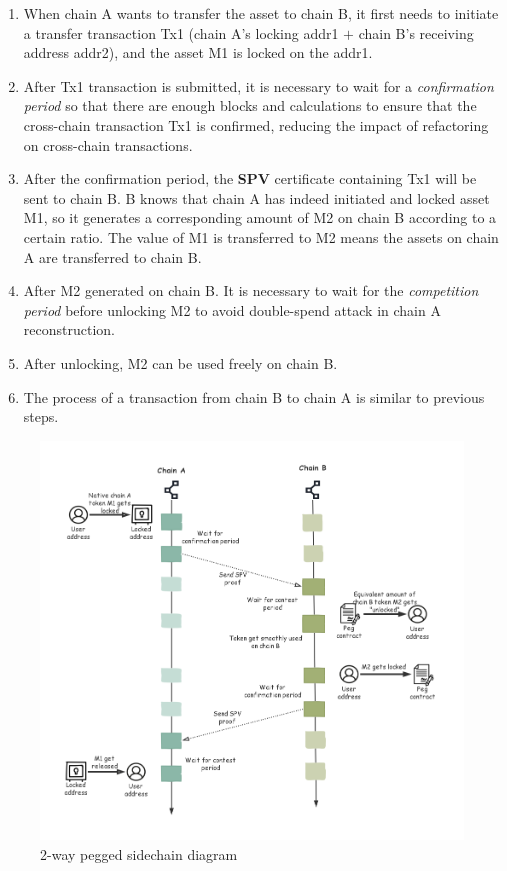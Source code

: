 \begin{enumerate}
    \item When chain A wants to transfer the asset to chain B, it first needs to initiate a transfer transaction Tx1 (chain A's locking addr1 $+$ chain B's receiving address addr2), and the asset M1 is locked on the addr1.
    \item After Tx1 transaction is submitted, it is necessary to wait for a \textit{confirmation period} so that there are enough blocks and calculations to ensure that the cross-chain transaction Tx1 is confirmed, reducing the impact of refactoring on cross-chain transactions.
    \item After the confirmation period, the \textbf{SPV} certificate containing Tx1 will be sent to chain B. B knows that chain A has indeed initiated and locked asset M1, so it generates a corresponding amount of M2 on chain B according to a certain ratio. The value of M1 is transferred to M2 means the assets on chain A are transferred to chain B.
    \item After M2 generated on chain B. It is necessary to wait for the \textit{competition period} before unlocking M2 to avoid double-spend attack in chain A reconstruction.
    \item After unlocking, M2 can be used freely on chain B.
    \item The process of a transaction from chain B to chain A is similar to previous steps.
\end{enumerate}
        \begin{figure}[h]
        \includegraphics[width=1\textwidth]{./figures/2way.png}
        \centering
        \caption{{2-way pegged sidechain diagram}\protect\footnotemark}
        \centering
        \label{fig:2way}
        
        \end{figure}
